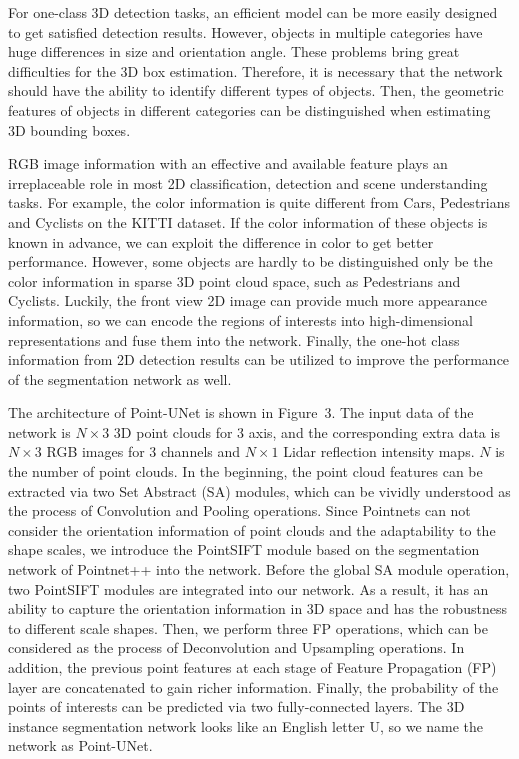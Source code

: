 \documentclass[letterpaper]{article} %
\begin{document}
For one-class 3D detection tasks, an efficient model can be more easily designed to get satisfied detection results. However, objects in multiple categories have huge differences in size and orientation angle. These problems bring great difficulties for the 3D box estimation. Therefore, it is necessary that the network should have the ability to identify different types of objects. Then, the geometric features of objects in different categories can be distinguished when estimating 3D bounding boxes.

RGB image information with an effective and available feature plays an irreplaceable role in most 2D classification, detection and scene understanding tasks. For example, the color information is quite different from Cars, Pedestrians and Cyclists on the KITTI dataset. If the color information of these objects is known in advance, we can exploit the difference in color to get better performance. However, some objects are hardly to be distinguished only be the color information in sparse 3D point cloud space, such as Pedestrians and Cyclists. Luckily, the front view 2D image can provide much more appearance information, so we can encode the regions of interests into high-dimensional representations and fuse them into the network. Finally, the one-hot class information from 2D detection results can be utilized to improve the performance of the segmentation network as well.

The architecture of Point-UNet is shown in Figure~3. The input data of the network is $N\times3$ 3D point clouds for 3 axis, and the corresponding extra data is $N\times3$ RGB images for 3 channels and $N\times1$ Lidar reflection intensity maps. $N$ is the number of point clouds. In the beginning, the point cloud features can be extracted via two Set Abstract (SA) modules, which can be vividly understood as the process of Convolution and Pooling operations. Since Pointnets can not consider the orientation information of point clouds and the adaptability to the shape scales, we introduce the PointSIFT module based on the segmentation network of Pointnet++ into the network. Before the global SA module operation, two PointSIFT modules are integrated into our network. As a result, it has an ability to capture the orientation information in 3D space and has the robustness to different scale shapes. Then, we perform three FP operations, which can be considered as the process of Deconvolution and Upsampling operations. In addition, the previous point features at each stage of Feature Propagation (FP) layer are concatenated to gain richer information. Finally, the probability of the points of interests can be predicted via two fully-connected layers. The 3D instance segmentation network looks like an English letter U, so we name the network as Point-UNet.
\end{document}
